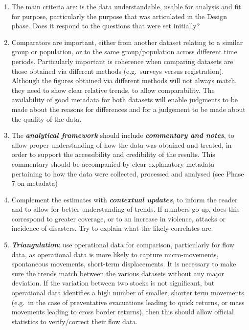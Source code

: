 \documentclass[
]{article}
\begin{document}
\begin{enumerate}
\def\labelenumi{\arabic{enumi}.}
\setcounter{enumi}{463}
\item
  The main criteria are: is the data understandable, usable for
  analysis and fit for purpose, particularly the purpose that was
  articulated in the Design phase. Does it respond to the questions
  that were set initially?
\item
  Comparators are important, either from another dataset relating to
  a similar group or population, or to the same group/population
  across different time periods. Particularly important is coherence
  when comparing datasets are those obtained via different methods
  (e.g.~surveys versus registration). Although the figures obtained
  via different methods will not always match, they need to show clear
  relative trends, to allow comparability. The availability of good
  metadata for both datasets will enable judgments to be made about
  the reasons for differences and for a judgement to be made about the
  quality of the data.
\item
  The \textbf{\emph{analytical framework}} should include \textbf{\emph{commentary and
  notes}}, to allow proper understanding of how the data was obtained
  and treated, in order to support the accessibility and credibility
  of the results. This commentary should be accompanied by clear
  explanatory metadata pertaining to how the data were collected,
  processed and analysed (see Phase 7 on metadata)
\item
  Complement the estimates with \textbf{\emph{contextual updates}}, to inform
  the reader and to allow for better understanding of trends. If
  numbers go up, does this correspond to greater coverage, or to an
  increase in violence, attacks or incidence of disasters. Try to
  explain what the likely correlates are.
\item
  \textbf{\emph{Triangulation}}: use operational data for comparison,
  particularly for flow data, as operational data is more likely to
  capture micro-movements, spontaneous movements, short-term
  displacements. It is necessary to make sure the trends match between
  the various datasets without any major deviation. If the variation
  between two stocks is not significant, but operational data
  identifies a high number of smaller, shorter term movements (e.g.~in
  the case of preventative evacuations leading to quick returns, or
  mass movements leading to cross border returns), then this should
  allow official statistics to verify/correct their flow data.

\end{enumerate}
\end{document}
